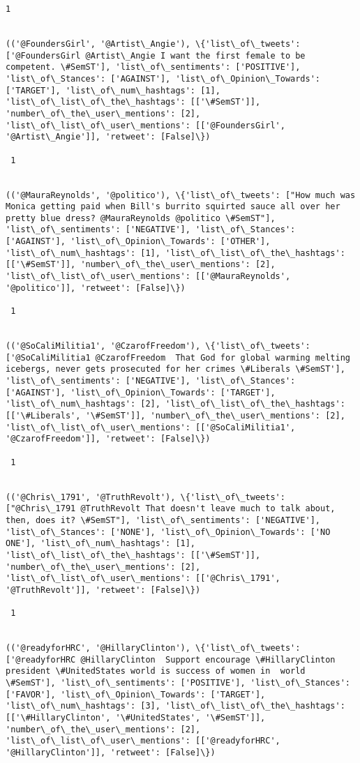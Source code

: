 \documentclass[11pt]{article}
\begin{document}
\begin{Verbatim}[commandchars=\\\{\}]
 1
 

(('@FoundersGirl', '@Artist\_Angie'), \{'list\_of\_tweets': ['@FoundersGirl @Artist\_Angie I want the first female to be competent. \#SemST'], 'list\_of\_sentiments': ['POSITIVE'], 'list\_of\_Stances': ['AGAINST'], 'list\_of\_Opinion\_Towards': ['TARGET'], 'list\_of\_num\_hashtags': [1], 'list\_of\_list\_of\_the\_hashtags': [['\#SemST']], 'number\_of\_the\_user\_mentions': [2], 'list\_of\_list\_of\_user\_mentions': [['@FoundersGirl', '@Artist\_Angie']], 'retweet': [False]\})

 1
 

(('@MauraReynolds', '@politico'), \{'list\_of\_tweets': ["How much was Monica getting paid when Bill's burrito squirted sauce all over her pretty blue dress? @MauraReynolds @politico \#SemST"], 'list\_of\_sentiments': ['NEGATIVE'], 'list\_of\_Stances': ['AGAINST'], 'list\_of\_Opinion\_Towards': ['OTHER'], 'list\_of\_num\_hashtags': [1], 'list\_of\_list\_of\_the\_hashtags': [['\#SemST']], 'number\_of\_the\_user\_mentions': [2], 'list\_of\_list\_of\_user\_mentions': [['@MauraReynolds', '@politico']], 'retweet': [False]\})

 1
 

(('@SoCaliMilitia1', '@CzarofFreedom'), \{'list\_of\_tweets': ['@SoCaliMilitia1 @CzarofFreedom  That God for global warming melting icebergs, never gets prosecuted for her crimes \#Liberals \#SemST'], 'list\_of\_sentiments': ['NEGATIVE'], 'list\_of\_Stances': ['AGAINST'], 'list\_of\_Opinion\_Towards': ['TARGET'], 'list\_of\_num\_hashtags': [2], 'list\_of\_list\_of\_the\_hashtags': [['\#Liberals', '\#SemST']], 'number\_of\_the\_user\_mentions': [2], 'list\_of\_list\_of\_user\_mentions': [['@SoCaliMilitia1', '@CzarofFreedom']], 'retweet': [False]\})

 1
 

(('@Chris\_1791', '@TruthRevolt'), \{'list\_of\_tweets': ["@Chris\_1791 @TruthRevolt That doesn't leave much to talk about, then, does it? \#SemST"], 'list\_of\_sentiments': ['NEGATIVE'], 'list\_of\_Stances': ['NONE'], 'list\_of\_Opinion\_Towards': ['NO ONE'], 'list\_of\_num\_hashtags': [1], 'list\_of\_list\_of\_the\_hashtags': [['\#SemST']], 'number\_of\_the\_user\_mentions': [2], 'list\_of\_list\_of\_user\_mentions': [['@Chris\_1791', '@TruthRevolt']], 'retweet': [False]\})

 1
 

(('@readyforHRC', '@HillaryClinton'), \{'list\_of\_tweets': ['@readyforHRC @HillaryClinton  Support encourage \#HillaryClinton president \#UnitedStates world is success of women in  world \#SemST'], 'list\_of\_sentiments': ['POSITIVE'], 'list\_of\_Stances': ['FAVOR'], 'list\_of\_Opinion\_Towards': ['TARGET'], 'list\_of\_num\_hashtags': [3], 'list\_of\_list\_of\_the\_hashtags': [['\#HillaryClinton', '\#UnitedStates', '\#SemST']], 'number\_of\_the\_user\_mentions': [2], 'list\_of\_list\_of\_user\_mentions': [['@readyforHRC', '@HillaryClinton']], 'retweet': [False]\})


\end{Verbatim}
\end{document}
